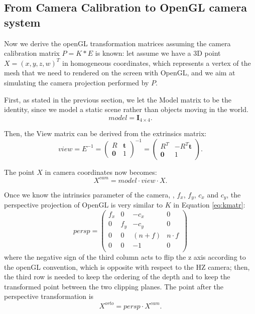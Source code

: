 \subsection{From Camera Calibration to OpenGL camera system}
Now we derive the openGL transformation matrices assuming the camera calibration matrix $P = K * E$ is known: let assume we have a 3D point $X = (x,y,z,w)^T$ in homogeneous coordinates, which represents a vertex of the mesh that we need to rendered on the screen with OpenGL, and we aim at simulating the camera projection performed by $P$.

First, as stated in the previous section, we let the Model matrix to be the identity, since we model a static scene rather than objects moving in the world.
\begin{equation}
  model = \mathbf{I}_{4\times4}.
\end{equation}

Then, the View matrix can be derived from the extrinsics matrix:
\begin{equation}
  view = E^{-1}=
  \begin{pmatrix}
    R & \mathbf{t}\\
    \mathbf{0}&1
  \end{pmatrix}^{-1} =
  \begin{pmatrix}
    R^T & -R^T\mathbf{t}\\
    \mathbf{0}&1
  \end{pmatrix}.
\end{equation}

The point $X$ in camera coordinates now becomes:
\begin{equation}
 X^{cam} = model \cdot view \cdot X.
\end{equation}



Once we know the intrinsics parameter of the camera, \ie,  $f_x$, $f_y$, $c_x$ and $c_y$, the perspective projection of OpenGL is very similar to $K$ in Equation \eqref{eq:kmatr}:
\begin{equation}
 persp =
 \begin{pmatrix}
  f_x & 0   & -c_x    & 0\\
  0   & f_y & -c_y    & 0\\
  0   & 0   & (n+f) & n\cdot f\\
  0   & 0   & -1      & 0\\
 \end{pmatrix}
\end{equation}
where the negative sign of the third column acts to flip the z axis according to the openGL convention, which is opposite with respect to the HZ camera; then, the third row is needed to keep the ordering of the depth and to keep the transformed point between the two clipping planes.
The point after the perspective transformation is
\begin{equation}
 X^{orto} = persp \cdot X^{cam}.
\end{equation}

